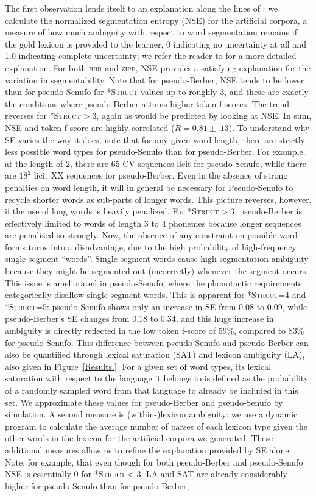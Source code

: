\documentclass[11pt]{article}
\begin{document}
The first observation lends itself to an explanation along the lines of \cite{Fourtassi13a}: we calculate the normalized segmentation entropy (NSE) for the artificial corpora, a measure of how much ambiguity with respect to word segmentation remains if the gold lexicon is provided to the learner, 0 indicating no uncertainty at all and 1.0 indicating complete uncertainty; we refer the reader to \cite{Fourtassi13a} for a more detailed explanation. For both \textsc{bbr} and \textsc{zipf}, NSE provides a satisfying explanation for the variation in segmentability. Note that for pseudo-Berber, NSE tends to be lower than for pseudo-Senufo for \textsc{*Struct}-values up to roughly 3, and these are exactly the conditions where pseudo-Berber attains higher token f-scores. The trend reverses for \textsc{*Struct}$>$3, again as would be predicted by looking at NSE. In sum, NSE and token f-score are highly correlated ($R = 0.81 \pm .13$). To understand why SE varies the way it does, note that for any given word-length, there are strictly less possible word types for pseudo-Senufo than for pseudo-Berber. For example, at the length of 2, there are 65 CV sequences licit for pseudo-Senufo, while there are $18^2$ licit XX sequences for pseudo-Berber. Even in the absence of strong penalties on word length, it will in general be necessary for Pseudo-Senufo to recycle shorter words as sub-parts of longer words.  This picture reverses, however, if the use of long words is heavily penalized. For \textsc{*Struct}$>$3, pseudo-Berber is effectively limited to words of length 3 to 4 phonemes because longer sequences are penalized so strongly. Now, the absence of any constraint on possible word-forms turns into a disadvantage, due to the high probability of high-frequency single-segment ``words''. Single-segment words cause high segmentation ambiguity because they might be segmented out (incorrectly) whenever the segment occurs. This issue is ameliorated in pseudo-Senufo, where the phonotactic requirements categorically disallow single-segment words. This is apparent for \textsc{*Struct}=4 and \textsc{*Struct}=5: pseudo-Senufo shows only an increase in SE from 0.08 to 0.09, while pseudo-Berber's SE changes from 0.18 to 0.34, and this huge increase in ambiguity is directly reflected in the low token f-score of 59\%, compared to 83\% for pseudo-Senufo. This difference between pseudo-Senufo and pseudo-Berber can also be quantified through lexical saturation (SAT) and lexicon ambiguity (LA), also given in Figure~\ref{Results.}. For a given set of word types, its lexical saturation with respect to the language it belongs to is defined as the probability of a randomly sampled word from that language to already be included in this set. We approximate these values for pseudo-Berber and pseudo-Senufo by simulation. A second measure is (within-)lexicon ambiguity: we use a dynamic program to calculate the average number of parses of each lexicon type given the other words in the lexicon for the artificial corpora we generated. These additional measures allow us to refine the explanation provided by SE alone. Note, for example, that even though for both pseudo-Berber and pseudo-Senufo NSE is essentially 0 for \textsc{*Struct}$<$3, LA and SAT are already considerably higher for pseudo-Senufo than for pseudo-Berber, 
\end{document}
